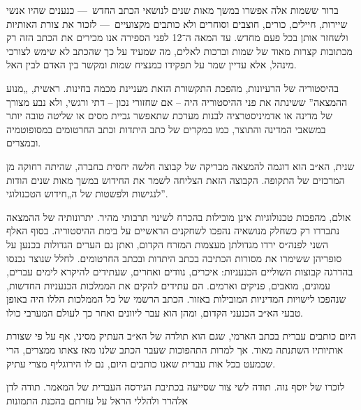 ברור ששמות אלה אפשרו במשך מאות שנים לנושאי הכתב החדש~— כנענים שהיו אנשי שיירות, חיילים, כורים, חוצבים וסוחרים ולא כותבים מקצועיים~— לזכור את צורת האותיות ולשחזר אותן בכל פעם מחדש. עד המאה ה־12 לפני הספירה אנו מכירים את הכתב הזה רק מכתובות קצרות מאוד של שמות וברכות לאלים, מה שמעיד על כך שהכתב לא שימש לצורכי מינהל, אלא עדיין שמר על תפקידו כמנציח שמות ומקשר בין האדם לבין האל.

בהיסטוריה של הרעיונות, מהפכת התקשורת הזאת מעניינת מכמה בחינות. ראשית, „מנוע ההמצאה” ששינתה את פני ההיסטוריה היה – אם שחזורי נכון – דתי ורגשי, ולא נבע מצורך של מדינה או אדמיניסטרציה לבנות מערכת שתאפשר גביית מסים או שליטה טובה יותר במשאבי המדינה והתוצר, כמו במקרים של כתב היתדות וכתב החרטומים במסופוטמיה ובמצרים.

שנית, הא״ב הוא דוגמה להמצאה מבריקה של קבוצה חלשה יחסית בחברה, שהיתה רחוקה מן המרכזים של התקופה. הקבוצה הזאת הצליחה לשמר את החידוש במשך מאות שנים הודות לנגישות ולפשטות של ה„חידוש הטכנולוגי”.

אולם, מהפכות טכנולוגיות אינן מובילות בהכרח לשינוי תרבותי מהיר. יתרונותיה של ההמצאה נתבררו רק כשחלק מנושאיה נהפכו לשחקנים הראשיים על בימת ההיסטוריה. בסוף האלף השני לפנה״ס ירדו מגדולתן מעצמות המזרח הקדום, ואתן גם הערים הגדולות בכנען על סופריהן ששימרו את מסורות הכתיבה בכתב היתדות ובכתב החרטומים. לחלל שנוצר נכנסו בהדרגה קבוצות השוליים הכנעניות: איכרים, נוודים ואחרים, שעתידים להיקרא לימים עברים, עמונים, מואבים, פניקים וארמים. הם עתידים להקים את הממלכות הכנעניות החדשות, שנהפכו לישויות המדיניות המובילות באזור. הכתב הרשמי של כל הממלכות הללו היה באופן טבעי הא״ב הכנעני הקדום, ומהן הוא עבר ליוונים ואחר כך לעולם המערבי כולו.

היום כותבים עברית בכתב הארמי, שגם הוא תולדה של הא״ב העתיק מסיני, אף על פי שצורת אותיותיו השתנתה מאוד. אך למרות התהפוכות שעבר הכתב שלנו מאז צאתו ממצרים, הרי שכמעט בכל אות עברית שאנו כותבים היום, נם לו הירוגליף מצרי עתיק.

לזכרו של יוסף נוה. תודה לשי צור שסייעה בכתיבת הגירסה העברית של המאמר. תודה לדן אלהרר ולהללי הראל על עזרתם בהכנת התמונות 

